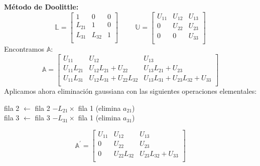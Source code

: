 \documentclass[9pt, aspectratio=169]{beamer}
\begin{document}
\begin{frame}
\textbf{Método de Doolittle:}
 \begin{equation*}
\mathbb{L} = \left[ 
 \begin{array}{ccc}
 1 & 0 & 0 \\
 L_{21} & 1 & 0 \\
 L_{31} & L_{32} &1 \\
 \end{array} \right] \hspace{1cm} 
\mathbb{U} = \left[ 
 \begin{array}{ccc}
 U_{11} & U_{12} & U_{13} \\
 0 & U_{22} & U_{23} \\
 0 & 0 & U_{33} \\
 \end{array} \right]
 \end{equation*}
Encontramos $\mathbb{A}$:
\begin{equation*}
 \mathbb{A}= \left[ \begin{array}{lll}
 U_{11} & U_{12} & U_{13} \\
 U_{11} L_{21} & U_{12} L_{21}+U_{22} & U_{13} L_{21} + U_{23} \\
 U_{11} L_{31} & U_{12} L_{31}+U_{22}L_{32} & U_{13} L_{31}+U_{23} L_{32} + U_{33} \\
 \end{array} \right]
\end{equation*}
Aplicamos ahora eliminación gaussiana con las siguientes operaciones elementales:
\begin{center}
 fila 2 $\leftarrow$ fila 2 $- L_{21} \times$ fila 1 (elimina $a_{21}$) \\
 fila 3 $\leftarrow$ fila 3 $- L_{31} \times$ fila 1 (elimina $a_{31}$)
\end{center}
\begin{equation*}
 \mathbb{A}^{\prime}= \left[ \begin{array}{ccc}
 U_{11} & U_{12} & U_{13} \\
 0 & U_{22} & U_{23} \\
 0 & U_{22}L_{32} & U_{23} L_{32} + U_{33} \\
 \end{array} \right]
\end{equation*}
\end{frame}
\end{document}
